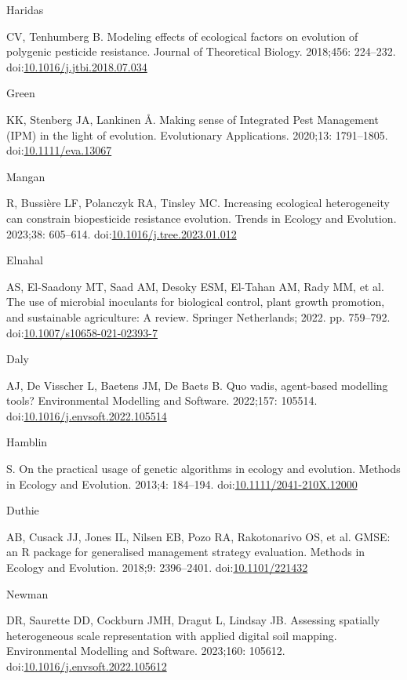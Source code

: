 \documentclass[10pt,letterpaper]{article}
\begin{document}
\begin{thebibliography}{30}
\hypertarget{ref-Haridas2018}{Haridas} CV, Tenhumberg B. {Modeling effects of ecological factors on evolution of polygenic pesticide resistance}. Journal of Theoretical Biology. 2018;456: 224--232. doi:\href{https://doi.org/10.1016/j.jtbi.2018.07.034}{10.1016/j.jtbi.2018.07.034}

\hypertarget{ref-Green2020}{Green} KK, Stenberg JA, Lankinen Å. {Making sense of Integrated Pest Management (IPM) in the light of evolution}. Evolutionary Applications. 2020;13: 1791--1805. doi:\href{https://doi.org/10.1111/eva.13067}{10.1111/eva.13067}

\hypertarget{ref-Mangan2023}{Mangan} R, Bussière LF, Polanczyk RA, Tinsley MC. {Increasing ecological heterogeneity can constrain biopesticide resistance evolution}. Trends in Ecology and Evolution. 2023;38: 605--614. doi:\href{https://doi.org/10.1016/j.tree.2023.01.012}{10.1016/j.tree.2023.01.012}

\hypertarget{ref-Elnahal2022}{Elnahal} AS, El-Saadony MT, Saad AM, Desoky ESM, El-Tahan AM, Rady MM, et al. {The use of microbial inoculants for biological control, plant growth promotion, and sustainable agriculture: A review}. Springer Netherlands; 2022. pp. 759--792. doi:\href{https://doi.org/10.1007/s10658-021-02393-7}{10.1007/s10658-021-02393-7}

\hypertarget{ref-Daly2022}{Daly} AJ, De Visscher L, Baetens JM, De Baets B. {Quo vadis, agent-based modelling tools?} Environmental Modelling and Software. 2022;157: 105514. doi:\href{https://doi.org/10.1016/j.envsoft.2022.105514}{10.1016/j.envsoft.2022.105514}

\hypertarget{ref-Hamblin2013}{Hamblin} S. {On the practical usage of genetic algorithms in ecology and evolution}. Methods in Ecology and Evolution. 2013;4: 184--194. doi:\href{https://doi.org/10.1111/2041-210X.12000}{10.1111/2041-210X.12000}

\hypertarget{ref-Duthie2018}{Duthie} AB, Cusack JJ, Jones IL, Nilsen EB, Pozo RA, Rakotonarivo OS, et al. {GMSE: an R package for generalised management strategy evaluation}. Methods in Ecology and Evolution. 2018;9: 2396--2401. doi:\href{https://doi.org/10.1101/221432}{10.1101/221432}

\hypertarget{ref-Newman2023}{Newman} DR, Saurette DD, Cockburn JMH, Dragut L, Lindsay JB. {Assessing spatially heterogeneous scale representation with applied digital soil mapping}. Environmental Modelling and Software. 2023;160: 105612. doi:\href{https://doi.org/10.1016/j.envsoft.2022.105612}{10.1016/j.envsoft.2022.105612}


\end{thebibliography}
\end{document}
